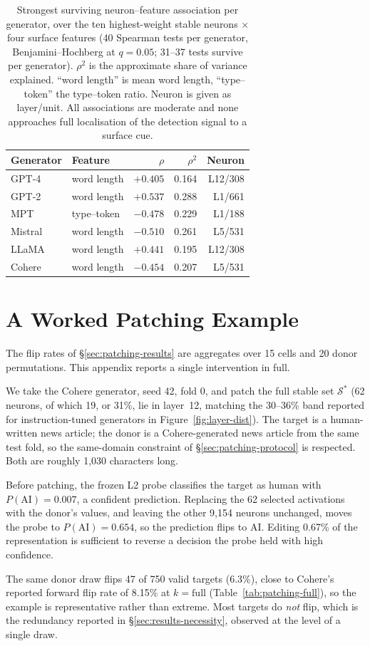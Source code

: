\documentclass[11pt]{article}
\begin{document}
\begin{table}[!htbp]
\centering
\small
\begin{tabular}{llrrr}
\toprule
Generator & Feature & $\rho$ & $\rho^2$ & Neuron \\
\midrule
GPT-4   & word length & $+0.405$ & 0.164 & L12/308 \\
GPT-2   & word length & $+0.537$ & 0.288 & L1/661  \\
MPT     & type--token & $-0.478$ & 0.229 & L1/188  \\
Mistral & word length & $-0.510$ & 0.261 & L5/531  \\
LLaMA   & word length & $+0.441$ & 0.195 & L12/308 \\
Cohere  & word length & $-0.454$ & 0.207 & L5/531  \\
\bottomrule
\end{tabular}
\caption{Strongest surviving neuron--feature association per generator, over
the ten highest-weight stable neurons $\times$ four surface features (40
Spearman tests per generator, Benjamini--Hochberg at $q=0.05$; 31--37 tests
survive per generator). $\rho^2$ is the approximate share of variance
explained. ``word length'' is mean word length, ``type--token'' the
type--token ratio. Neuron is given as layer/unit. All associations are moderate
and none approaches full localisation of the detection signal to a surface
cue.}
\label{tab:features}
\end{table}

\section{A Worked Patching Example}
\label{app:worked-example}

The flip rates of §\ref{sec:patching-results} are aggregates over 15 cells and
20 donor permutations. This appendix reports a single intervention in full.

We take the Cohere generator, seed 42, fold 0, and patch the full stable set
$\mathcal{S}^{*}$ (62 neurons, of which 19, or 31\%, lie in layer~12,
matching the 30--36\% band reported for instruction-tuned generators in
Figure~\ref{fig:layer-dist}). The target is a human-written news article; the
donor is a Cohere-generated news article from the same test fold, so the
same-domain constraint of §\ref{sec:patching-protocol} is respected. Both are
roughly 1{,}030 characters long.

Before patching, the frozen L2 probe classifies the target as human with
$P(\text{AI}) = 0.007$, a confident prediction. Replacing the 62 selected
activations with the donor's values, and leaving the other 9{,}154 neurons
unchanged, moves the probe to $P(\text{AI}) = 0.654$, so the prediction flips
to AI. Editing 0.67\% of the representation is sufficient to reverse a decision
the probe held with high confidence.

The same donor draw flips 47 of 750 valid targets (6.3\%), close to Cohere's
reported forward flip rate of 8.15\% at $k = \text{full}$
(Table~\ref{tab:patching-full}), so the example is representative rather than
extreme. Most targets do \textit{not} flip, which is the redundancy reported
in §\ref{sec:results-necessity}, observed at the level of a single draw.
\end{document}
